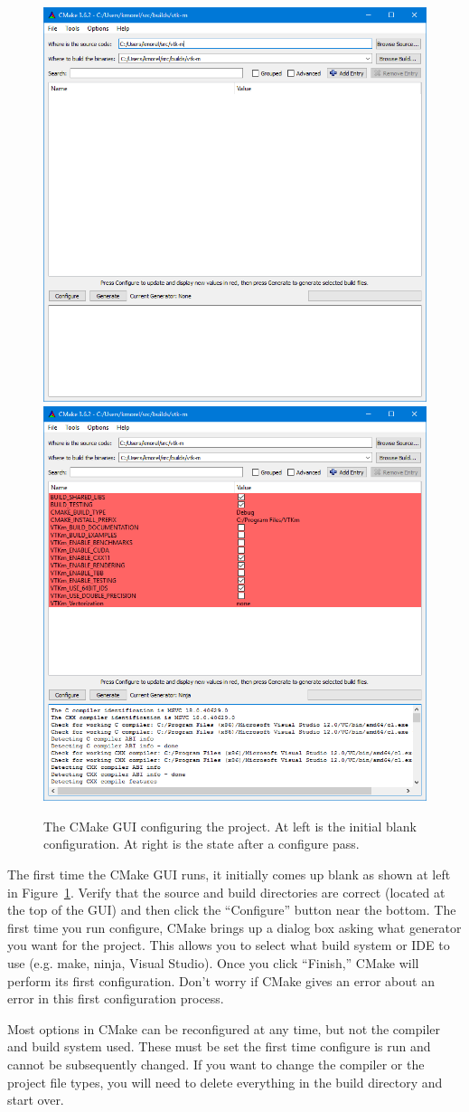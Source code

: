 \begin{figure}[htb]
  \centering
  \includegraphics[width=.49\linewidth]{images/CMakeGUIBlank}
  \includegraphics[width=.49\linewidth]{images/CMakeGUI}
  \caption[The CMake GUI configuring the \VTKm project.]{
    The CMake GUI configuring the \VTKm project.
    At left is the initial blank configuration.
    At right is the state after a configure pass.
  }
  \label{fig:CMakeGUI}
\end{figure}

The first time the CMake GUI runs, it initially comes up blank as shown at left in Figure~\ref{fig:CMakeGUI}.
Verify that the source and build directories are correct (located at the top of the GUI) and then click the ``Configure'' button near the bottom.
The first time you run configure, CMake brings up a dialog box asking what generator you want for the project.
This allows you to select what build system or IDE to use (e.g. make, ninja, Visual Studio).
Once you click ``Finish,'' CMake will perform its first configuration.
Don't worry if CMake gives an error about an error in this first configuration process.

\begin{commonerrors}
  Most options in CMake can be reconfigured at any time, but not the compiler and build system used.
  These must be set the first time configure is run and cannot be subsequently changed.
  If you want to change the compiler or the project file types, you will need to delete everything in the build directory and start over.
\end{commonerrors}

